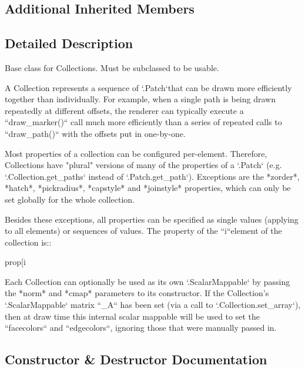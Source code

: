 \subsection*{Additional Inherited Members}


\subsection{Detailed Description}
\begin{DoxyVerb}Base class for Collections. Must be subclassed to be usable.

A Collection represents a sequence of `.Patch`\es that can be drawn
more efficiently together than individually. For example, when a single
path is being drawn repeatedly at different offsets, the renderer can
typically execute a ``draw_marker()`` call much more efficiently than a
series of repeated calls to ``draw_path()`` with the offsets put in
one-by-one.

Most properties of a collection can be configured per-element. Therefore,
Collections have "plural" versions of many of the properties of a `.Patch`
(e.g. `.Collection.get_paths` instead of `.Patch.get_path`). Exceptions are
the *zorder*, *hatch*, *pickradius*, *capstyle* and *joinstyle* properties,
which can only be set globally for the whole collection.

Besides these exceptions, all properties can be specified as single values
(applying to all elements) or sequences of values. The property of the
``i``\th element of the collection is::

  prop[i %

Each Collection can optionally be used as its own `.ScalarMappable` by
passing the *norm* and *cmap* parameters to its constructor. If the
Collection's `.ScalarMappable` matrix ``_A`` has been set (via a call
to `.Collection.set_array`), then at draw time this internal scalar
mappable will be used to set the ``facecolors`` and ``edgecolors``,
ignoring those that were manually passed in.
\end{DoxyVerb}
 

\subsection{Constructor \& Destructor Documentation}
\mbox{\label{classmatplotlib_1_1collections_1_1Collection_a2144120848c8ebd0ba306a9a62c6e1c9}} 
